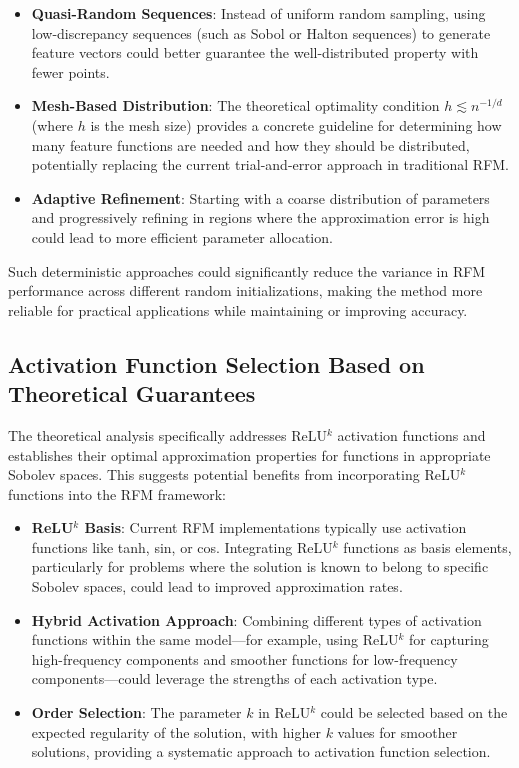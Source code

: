\documentclass[11pt]{article}
\begin{document}
\begin{itemize}
    \item \textbf{Quasi-Random Sequences}: Instead of uniform random sampling, using low-discrepancy sequences (such as Sobol or Halton sequences) to generate feature vectors could better guarantee the well-distributed property with fewer points.
    
    \item \textbf{Mesh-Based Distribution}: The theoretical optimality condition $h \lesssim n^{-1/d}$ (where $h$ is the mesh size) provides a concrete guideline for determining how many feature functions are needed and how they should be distributed, potentially replacing the current trial-and-error approach in traditional RFM.
    
    \item \textbf{Adaptive Refinement}: Starting with a coarse distribution of parameters and progressively refining in regions where the approximation error is high could lead to more efficient parameter allocation.
\end{itemize}

Such deterministic approaches could significantly reduce the variance in RFM performance across different random initializations, making the method more reliable for practical applications while maintaining or improving accuracy.

\subsection{Activation Function Selection Based on Theoretical Guarantees}

The theoretical analysis specifically addresses ReLU$^k$ activation functions and establishes their optimal approximation properties for functions in appropriate Sobolev spaces. This suggests potential benefits from incorporating ReLU$^k$ functions into the RFM framework:

\begin{itemize}
    \item \textbf{ReLU$^k$ Basis}: Current RFM implementations typically use activation functions like tanh, sin, or cos. Integrating ReLU$^k$ functions as basis elements, particularly for problems where the solution is known to belong to specific Sobolev spaces, could lead to improved approximation rates.
    
    \item \textbf{Hybrid Activation Approach}: Combining different types of activation functions within the same model—for example, using ReLU$^k$ for capturing high-frequency components and smoother functions for low-frequency components—could leverage the strengths of each activation type.
    
    \item \textbf{Order Selection}: The parameter $k$ in ReLU$^k$ could be selected based on the expected regularity of the solution, with higher $k$ values for smoother solutions, providing a systematic approach to activation function selection.
\end{itemize}
\end{document}
